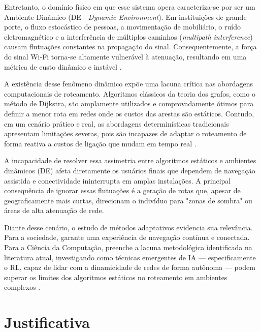 \documentclass[
    12pt,                %
    openright,           %
    oneside,             %
    a4paper,             %
    english,             %
    brazil               %
]{abntex2}
\begin{document}
Entretanto, o domínio físico em que esse sistema opera caracteriza-se por ser um Ambiente Dinâmico (DE - \textit{Dynamic Environment}). Em instituições de grande porte, o fluxo estocástico de pessoas, a movimentação de mobiliário, o ruído eletromagnético e a interferência de múltiplos caminhos (\textit{multipath interference}) causam flutuações constantes na propagação do sinal. Consequentemente, a força do sinal Wi-Fi torna-se altamente vulnerável à atenuação, resultando em uma métrica de custo dinâmico e instável \cite{Chia2025}.

A existência desse fenômeno dinâmico expõe uma lacuna crítica nas abordagens computacionais de roteamento. Algoritmos clássicos da teoria dos grafos, como o método de Dijkstra, são amplamente utilizados e comprovadamente ótimos para definir a menor rota em redes onde os custos das arestas são estáticos. Contudo, em um cenário prático e real, as abordagens determinísticas tradicionais apresentam limitações severas, pois são incapazes de adaptar o roteamento de forma reativa a custos de ligação que mudam em tempo real \cite{Pham2025}.

A incapacidade de resolver essa assimetria entre algoritmos estáticos e ambientes dinâmicos (DE) afeta diretamente os usuários finais que dependem de navegação assistida e conectividade ininterrupta em amplas instalações. A principal consequência de ignorar essas flutuações é a geração de rotas que, apesar de geograficamente mais curtas, direcionam o indivíduo para "zonas de sombra" ou áreas de alta atenuação de rede.

Diante desse cenário, o estudo de métodos adaptativos evidencia sua relevância. Para a sociedade, garante uma experiência de navegação contínua e conectada. Para a Ciência da Computação, preenche a lacuna metodológica identificada na literatura atual, investigando como técnicas emergentes de IA --- especificamente o RL, capaz de lidar com a dinamicidade de redes de forma autônoma --- podem superar os limites dos algoritmos estáticos no roteamento em ambientes complexos \cite{Pham2025}.

\section{Justificativa}
\label{sec:justificativa}
\end{document}
